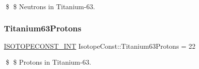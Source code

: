 \$ \$ Neutrons in Titanium-\/63. \mbox{\label{group___isotope_const-_titanium-_ti63_gaae9af647dcd0ac234239cf20440743d7}} 
\subsubsection{\texorpdfstring{Titanium63\+Protons}{Titanium63Protons}}
{\footnotesize\ttfamily \mbox{\hyperlink{group___isotope_const-_macros_ga5f18360b3e99483a35c32d789e62621c}{I\+S\+O\+T\+O\+P\+E\+C\+O\+N\+S\+T\+\_\+\+I\+NT}} Isotope\+Const\+::\+Titanium63\+Protons = 22}

\$ \$ Protons in Titanium-\/63. 